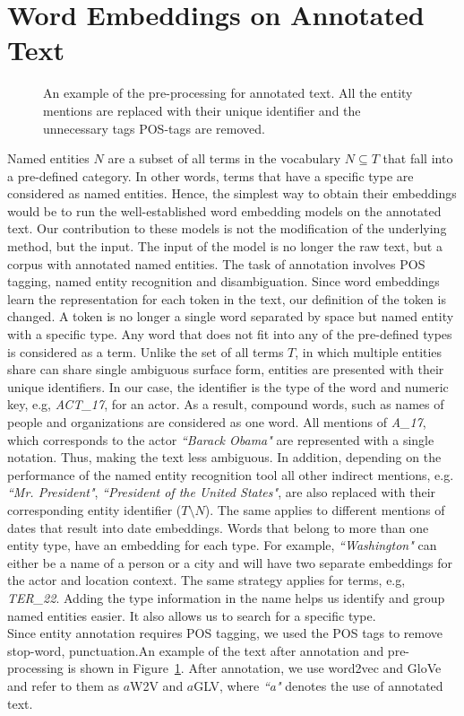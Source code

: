 \section{Word Embeddings on Annotated Text}\label{sec:annotated}
\begin{figure}
\centering 
\resizebox{0.85\textwidth}{0.28\textwidth}{      

}
\caption{An example of the pre-processing for annotated text. All the entity mentions are replaced with their unique identifier and the unnecessary tags POS-tags are removed. }
\label{fig:annotation}
\end{figure}
Named entities $N$ are a subset of all terms in the vocabulary $N\subseteq T$ that fall into a pre-defined category. In other words, terms that have a specific type are considered as named entities. Hence, the simplest way to obtain their embeddings would be to run the well-established word embedding models on the annotated text. Our contribution to these models is not the modification of the underlying method, but the input. The input of the model is no longer the raw text, but a corpus with annotated named entities. The task of annotation involves POS tagging, named entity recognition and disambiguation. Since word embeddings learn the representation for each token in the text, our definition of the token is changed. A token is no longer a single word separated by space but named entity with a specific type. Any word that does not fit into any of the pre-defined types is considered as a term. Unlike the set of all terms $T$, in which multiple entities share can share single ambiguous surface form, entities are presented with their unique identifiers. In our case, the identifier is the type of the word and numeric key, e.g,  \emph{ACT\_17}, for an actor. As a result, compound words, such as names of people and organizations are considered as one word. All mentions of  \emph{A\_17}, which corresponds to the actor  \emph{``Barack Obama"} are represented with a single notation. Thus, making the text less ambiguous. In addition, depending on the performance of the named entity recognition tool all other indirect mentions, e.g. \emph{``Mr. President"}, \emph{``President of the United States"}, are also replaced with their corresponding entity identifier ($T\setminus  N$). The same applies to different mentions of dates that result into date embeddings. Words that belong to more than one entity type, have an embedding for each type. For example, \emph{``Washington"} can either be a name of a person or a city and will have two separate embeddings for the actor and location context. The same strategy applies for terms, e.g,  \emph{TER\_22}.  Adding the type information in the name helps us identify and group named entities easier. It also allows us to search for a specific type. \\
Since entity annotation requires POS tagging, we used the POS tags to remove stop-word, punctuation.An example of the text after annotation and pre-processing is shown in Figure~\ref{fig:annotation}. After annotation, we use word2vec and GloVe and refer to them as $a$W2V and $a$GLV, where \emph{``a"} denotes the use of annotated text. 

